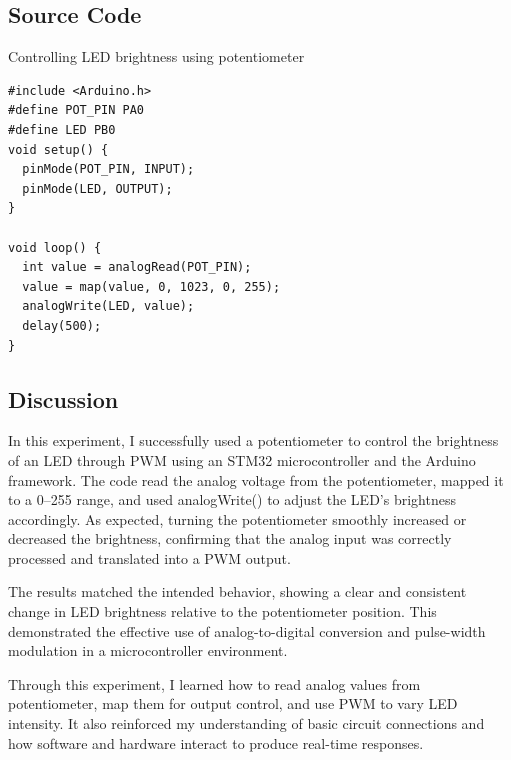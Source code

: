 \subsection{Source Code}
\begin{code}
\caption{Controlling LED brightness using potentiometer}
\begin{verbatim}
#include <Arduino.h>
#define POT_PIN PA0
#define LED PB0
void setup() {
  pinMode(POT_PIN, INPUT);
  pinMode(LED, OUTPUT);
}

void loop() {
  int value = analogRead(POT_PIN);
  value = map(value, 0, 1023, 0, 255);
  analogWrite(LED, value);
  delay(500);
}
\end{verbatim}
    \label{code:Potentiometer}
\end{code}


\subsection{Discussion}

In this experiment, I successfully used a potentiometer to control
the brightness of an LED through PWM using an STM32 microcontroller
and the Arduino framework. The code read the analog voltage
from the potentiometer, mapped it to a 0–255 range, and used analogWrite() 
to adjust the LED's brightness accordingly.
As expected, turning the potentiometer smoothly increased 
or decreased the brightness, confirming that the analog input was
correctly processed and translated into a PWM output.

The results matched the intended behavior,
showing a clear and consistent change in LED brightness relative to
the potentiometer position. This demonstrated the effective use of
analog-to-digital conversion and pulse-width modulation in a microcontroller
environment.

Through this experiment, I learned how to read analog values from potentiometer,
map them for output control, and use PWM to vary LED intensity.
It also reinforced my understanding of basic circuit connections
and how software and hardware interact to produce real-time responses.

